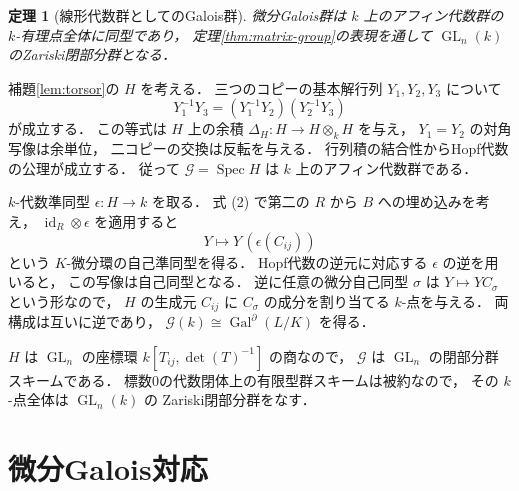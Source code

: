 \documentclass[a5paper,10pt,onecolumn]{jsarticle}
\makeatletter
\theoremstyle{mathnotetheorem}
\newtheorem{theorem}{定理}[section]
\renewcommand{\proofname}{証明}
\renewenvironment{proof}[1][\proofname]{%
  \par\pushQED{\qed}\normalfont\topsep4\p@\@plus2\p@\relax
  \trivlist\item[\hskip\labelsep\bfseries #1]\ignorespaces
}{\popQED\endtrivlist\@endpefalse}
\makeatother
\begin{document}
\begin{theorem}[線形代数群としてのGalois群]
\label{thm:alg-group}
微分Galois群は $k$ 上のアフィン代数群の
$k$-有理点全体に同型であり，
定理\ref{thm:matrix-group}の表現を通して
$\operatorname{GL}_n(k)$ のZariski閉部分群となる．
\end{theorem}
\begin{proof}
補題\ref{lem:torsor}の $H$ を考える．
三つのコピーの基本解行列 $Y_1,Y_2,Y_3$ について
\[
 Y_1^{-1}Y_3=(Y_1^{-1}Y_2)(Y_2^{-1}Y_3)
\]
が成立する．
この等式は $H$ 上の余積
$\Delta_H:H\to H\otimes_kH$ を与え，
$Y_1=Y_2$ の対角写像は余単位，
二コピーの交換は反転を与える．
行列積の結合性からHopf代数の公理が成立する．
従って $\mathcal G=\operatorname{Spec}H$ は
$k$ 上のアフィン代数群である．

$k$-代数準同型 $\epsilon:H\to k$ を取る．
式 (2) で第二の $R$ から $B$ への埋め込みを考え，
$\operatorname{id}_R\otimes\epsilon$ を適用すると
\[
 Y\longmapsto Y\,(\epsilon(C_{ij}))
\]
という $K$-微分環の自己準同型を得る．
Hopf代数の逆元に対応する $\epsilon$ の逆を用いると，
この写像は自己同型となる．
逆に任意の微分自己同型 $\sigma$ は
$Y\mapsto YC_\sigma$ という形なので，
$H$ の生成元 $C_{ij}$ に $C_\sigma$ の成分を割り当てる
$k$-点を与える．
両構成は互いに逆であり，
$\mathcal G(k)\cong\operatorname{Gal}^\partial(L/K)$ を得る．

$H$ は $\operatorname{GL}_n$ の座標環
$k[T_{ij},\det(T)^{-1}]$ の商なので，
$\mathcal G$ は $\operatorname{GL}_n$ の閉部分群スキームである．
標数0の代数閉体上の有限型群スキームは被約なので，
その $k$-点全体は $\operatorname{GL}_n(k)$ の
Zariski閉部分群をなす．
\end{proof}

\section{微分Galois対応}
\end{document}
